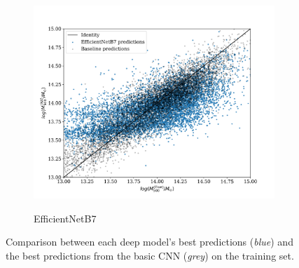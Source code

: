 \begin{figure}[H]
\begin{subfigure}{.325\textwidth}
    \includegraphics[width=\linewidth]{images/Chapter4/Results/training_EfficientNetB7_scatter.png}
    \label{fig:training_EfficientNetB7_scatter}
    \caption{EfficientNetB7}
\end{subfigure}
\caption{Comparison between each deep model's best predictions (\textit{blue}) and the best predictions from the basic CNN (\textit{grey}) on the training set.}
\end{figure}

